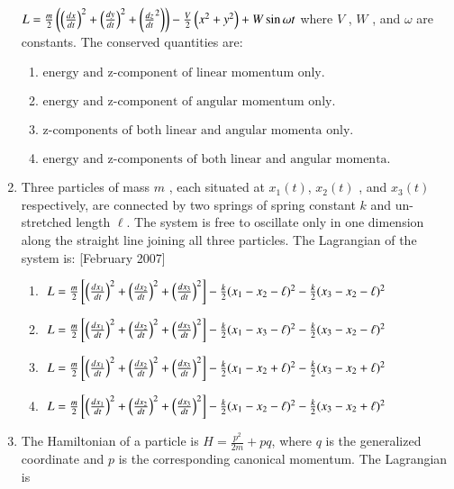 \documentclass[journal]{IEEEtran}
\begin{document}
\begin{enumerate}
$L = \frac{m}{2} \left( \left( \frac{dx}{dt} \right)^2 + \left( \frac{dy}{dt} \right)^2 + \left( \frac{dz}{dt}^2 \right) \right) - \frac{V}{2} \left( x^2 + y^2 \right) + W \sin \omega t $
where  $V$ ,  $W$ , and  $\omega$  are constants. The conserved quantities are:
\begin{enumerate}
\item $\text{energy and z-component of linear momentum only.}$
\item $ \text{energy and z-component of angular momentum only.} $
\item $\text{z-components of both linear and angular momenta only.} $
\item $ \text{energy and z-components of both linear and angular momenta.}$
\end{enumerate} 
\item Three particles of mass  $m$ , each situated at $ x_1(t) $,  $x_2(t)$ , and $ x_3(t)$  respectively, are connected by two springs of spring constant  $k$ and un-stretched length $ \ell $. The system is free to oscillate only in one dimension along the straight line joining all three particles. The Lagrangian of the system is: \hfill[February 2007]
\begin{enumerate}
\item $ \ L = \frac{m}{2} {}\left[ \left(\frac{dx_1}{dt}\right)^2 + \left( \frac{dx_2}{dt} \right)^2 + \left( \frac{dx_3}{dt} \right)^2\right] - \frac{k}{2} (x_1 - x_2 - \ell)^2 - \frac{k}{2} (x_3 - x_2 - \ell)^2$
\item $ \ L = \frac{m}{2} {}\left[ \left(\frac{dx_1}{dt}\right)^2 + \left( \frac{dx_2}{dt} \right)^2 + \left( \frac{dx_3}{dt} \right)^2\right] - \frac{k}{2} (x_1 - x_3 - \ell)^2 - \frac{k}{2} (x_3 - x_2 - \ell)^2$
\item  $ \ L = \frac{m}{2} {}\left[ \left(\frac{dx_1}{dt}\right)^2 + \left( \frac{dx_2}{dt} \right)^2 + \left( \frac{dx_3}{dt} \right)^2\right] - \frac{k}{2} (x_1 - x_2 + \ell)^2 - \frac{k}{2} (x_3 - x_2 + \ell)^2$
\item $ \ L = \frac{m}{2} {}\left[ \left(\frac{dx_1}{dt}\right)^2 + \left( \frac{dx_2}{dt} \right)^2 + \left( \frac{dx_3}{dt} \right)^2\right]  - \frac{k}{2} (x_1 - x_2 - \ell)^2 - \frac{k}{2} (x_3 - x_2 + \ell)^2$
\end{enumerate}
\item The Hamiltonian of a particle is $ H = \frac{p^2}{2m} + pq $, where  $q$ is the generalized coordinate and  $p$  is the corresponding canonical momentum. The Lagrangian is 


\end{enumerate}
\end{document}
